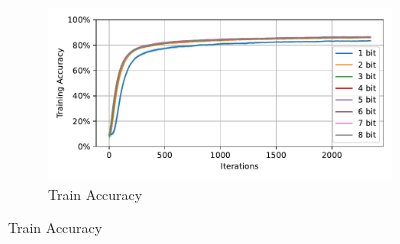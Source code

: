     \label{appendix:accuracy_curves_fashion_mnist}
        \begin{figure}[H]
            \centering
            \begin{subfigure}[H]{\textwidth}
                \centering
                \includegraphics[width=\textwidth]{../standard/FashionMNIST/plots/fashionmnist_train_acc.pdf}
                \caption{Train Accuracy}
            \end{subfigure}
        \end{figure}
